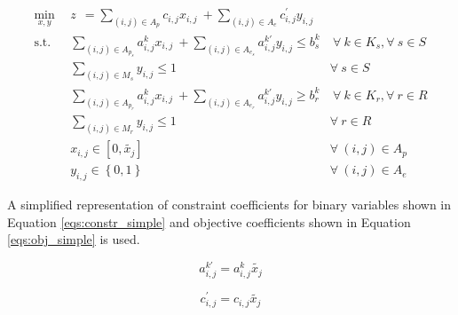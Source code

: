 \begin{subequations}\label{eqs:NFCTP}
  \begin{align}
    \min_{x, y} \:\: 
    & 
    z \:\: = 
    \sum_{(i, j) \in A_p} c_{i,j} x_{i,j} 
    \: + 
    \sum_{(i, j) \in A_e} c^{\prime}_{i,j} y_{i,j} 
    & 
    \label{eqs:NFCTP_obj} \\
    \text{s.t.} \:\: 
    &
    \sum_{(i, j) \in A_{p_s}} a^k_{i,j} x_{i,j}
    \: + 
    \sum_{(i, j) \in A_{e_s}} a^{k\prime}_{i,j} y_{i,j}
    \leq b^k_s 
    &
    \: 
    \forall \: k \in K_s, 
    \forall \: s \in S 
    \label{eqs:NFCTP_sup} \\
    &
    \sum_{(i, j) \in M_{s}} y_{i,j} \leq 1 
    &
    \forall \: s \in S 
    \label{eqs:NFCTP_mut_sup} \\
    &
    \sum_{(i, j) \in A_{p_r}} a^k_{i,j} x_{i,j}
    \: + 
    \sum_{(i, j) \in A_{e_r}} a^{k\prime}_{i,j} y_{i,j}
    \geq b^k_r 
    &
    \: 
    \forall \: k \in K_r,  
    \forall \: r \in R 
    \label{eqs:NFCTP_req} \\
    &
    \sum_{(i, j) \in M_{r}} y_{i,j} \leq 1 
    &
    \forall \: r \in R 
    \label{eqs:NFCTP_mut_req} \\
    &
    x_{i,j} \in [0, \tilde{x_j}]
    &
    \forall \: (i, j) \in A_p
    \label{eqs:NFCTP_x} \\
    &
    y_{i,j} \in \left\{ 0, 1 \right\}
    &
    \forall \: (i, j) \in A_e
    \label{eqs:NFCTP_y}
  \end{align}
\end{subequations}

\noindent
A simplified representation of constraint coefficients for binary variables
shown in Equation \ref{eqs:constr_simple} and objective coefficients shown in
Equation \ref{eqs:obj_simple} is used.

\begin{equation}\label{eqs:constr_simple}
a^{k\prime}_{i,j} = a^k_{i,j} \tilde{x_j}
\end{equation}

\begin{equation}\label{eqs:obj_simple}
c^{\prime}_{i,j} = c_{i,j} \tilde{x_j}
\end{equation}

